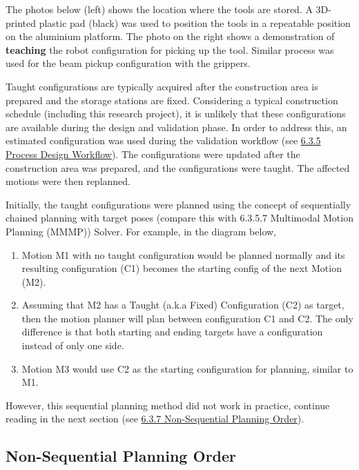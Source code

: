 The photos below (left) shows the location where the tools are stored. A 3D-printed plastic pad (black) was used to position the tools in a repeatable position on the aluminium platform. The photo on the right shows a demonstration of \textbf{teaching }the robot configuration for picking up the tool. Similar process was used for the beam pickup configuration with the grippers.




Taught configurations are typically acquired after the construction area is prepared and the storage stations are fixed. Considering a typical construction schedule (including this research project), it is unlikely that these configurations are available during the design and validation phase. In order to address this, an estimated configuration was used during the validation workflow (see \ul{6.3.5 Process Design Workflow}). The configurations were updated after the construction area was prepared, and the configurations were taught. The affected motions were then replanned.

Initially, the taught configurations were planned using the concept of sequentially chained planning with target poses (compare this with 6.3.5.7 Multimodal Motion Planning (MMMP)) Solver. For example, in the diagram below,

\begin{enumerate}
	\item Motion M1 with no taught configuration would be planned normally and its resulting configuration (C1) becomes the starting config of the next Motion (M2). 

	\item Assuming that M2 has a Taught (a.k.a Fixed) Configuration (C2) as target, then the motion planner will plan between configuration C1 and C2. The only difference is that both starting and ending targets have a configuration instead of only one side.

	\item Motion M3 would use C2 as the starting configuration for planning, similar to M1.

\end{enumerate}



However, this sequential planning method did not work in practice, continue reading in the next section (see \ul{6.3.7 Non-Sequential Planning Order}).

\subsection{Non-Sequential Planning Order}

